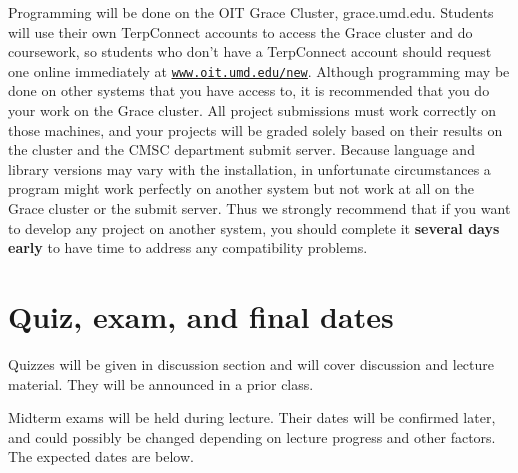 \documentclass[10pt]{article}
\begin{document}
    Programming will be done on the OIT Grace Cluster, grace.umd.edu.
  Students will use their own TerpConnect accounts to access the Grace
  cluster and do coursework, so students who don't have a TerpConnect
  account should request one online immediately at
   \href{http://www.oit.umd.edu/new}
        {\texttt{\underline{www.oit.umd.edu/new}}}.
  Although programming may be done on other systems that you have access to,
  it is recommended that you do your work on the Grace cluster.  All project
  submissions must work correctly on those machines, and your projects will
  be graded solely based on their results on the cluster and the CMSC
  department submit server.  Because language and library versions may vary
  with the installation, in unfortunate circumstances a program might work
  perfectly on another system but not work at all on the Grace cluster or
  the submit server.  Thus we strongly recommend that if you want to develop
  any project on another system, you should complete it \textbf{several days
  early} to have time to address any compatibility problems.


  \section{Quiz, exam, and final dates\label{section:examdates}}

    Quizzes will be given in discussion section and will cover discussion and
  lecture material.  They will be announced in a prior class.

    Midterm exams will be held during lecture.  Their dates will be confirmed
  later, and could possibly be changed depending on lecture progress and
  other factors.  The expected dates are below.
\end{document}
